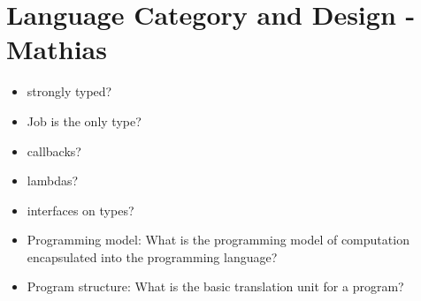 \section{Language Category and Design - Mathias}
\label{sect:desg}
\begin{itemize}
\item strongly typed?
\item Job is the only type?
\item callbacks?
\item lambdas?
\item interfaces on types?
\item Programming model: What is the programming model of
computation encapsulated into the programming language?
\item Program structure: What is the basic translation unit for a
program?
\end{itemize}
